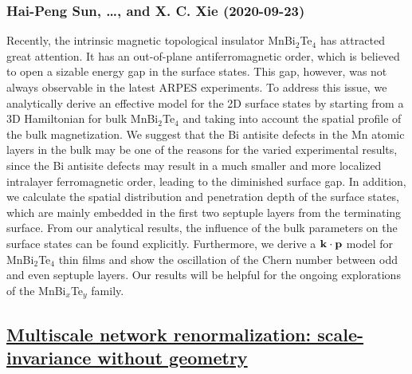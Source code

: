 \subsubsection*{Hai-Peng Sun, \dots, and X. C. Xie (2020-09-23)}
Recently, the intrinsic magnetic topological insulator MnBi$_2$Te$_4$ has
attracted great attention. It has an out-of-plane antiferromagnetic order,
which is believed to open a sizable energy gap in the surface states. This gap,
however, was not always observable in the latest ARPES experiments. To address
this issue, we analytically derive an effective model for the 2D surface states
by starting from a 3D Hamiltonian for bulk MnBi$_2$Te$_4$ and taking into
account the spatial profile of the bulk magnetization. We suggest that the Bi
antisite defects in the Mn atomic layers in the bulk may be one of the reasons
for the varied experimental results, since the Bi antisite defects may result
in a much smaller and more localized intralayer ferromagnetic order, leading to
the diminished surface gap. In addition, we calculate the spatial distribution
and penetration depth of the surface states, which are mainly embedded in the
first two septuple layers from the terminating surface. From our analytical
results, the influence of the bulk parameters on the surface states can be
found explicitly. Furthermore, we derive a $\bf{k}\cdot \bf{p}$ model for
MnBi$_2$Te$_4$ thin films and show the oscillation of the Chern number between
odd and even septuple layers. Our results will be helpful for the ongoing
explorations of the MnBi$_x$Te$_y$ family.

\subsection*{\href{http://arxiv.org/abs/2009.11024v1}{Multiscale network renormalization: scale-invariance without geometry}}
